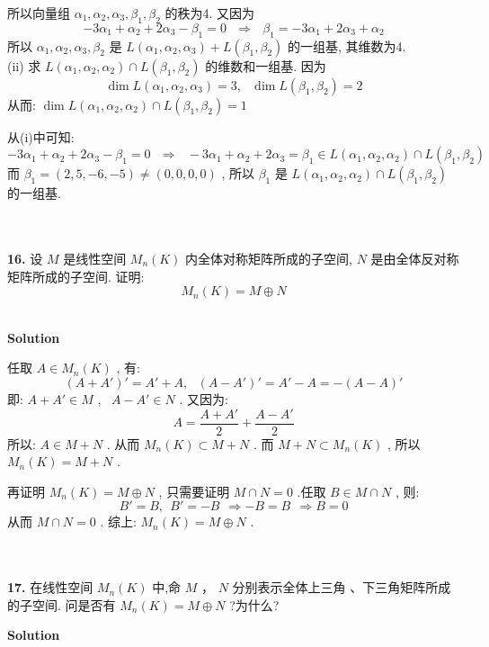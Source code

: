 \documentclass[11pt,a4paper,openany,oneside]{book}
\newcommand\Solution{\noindent\textbf{\textsf{Solution}}\par\medskip}
\begin{document}
所以向量组 $ \alpha_1, \alpha_2, \alpha_3, \beta_1, \beta_2 $ 的秩为4. 又因为
 $$   -3\alpha_1 + \alpha_2 + 2\alpha_3 -\beta_1 = 0 \ \ \ \Rightarrow \ \ \ \beta_1 = -3\alpha_1 + 2\alpha_3 + \alpha_2  $$ 
所以 $ \alpha_1, \alpha_2, \alpha_3, \beta_2 $ 是 $ L(\alpha_1, \alpha_2, \alpha_3) + L(\beta_1, \beta_2) $ 的一组基, 其维数为4.  \\

(ii) 求 $ L(\alpha_1, \alpha_2, \alpha_2) \cap L(\beta_1, \beta_2) $ 的维数和一组基. 因为
 $$  \dim L(\alpha_1, \alpha_2, \alpha_3) = 3, \ \ \ \dim L(\beta_1, \beta_2) = 2  $$ 
从而:  $ \dim L(\alpha_1, \alpha_2, \alpha_2) \cap L(\beta_1, \beta_2) = 1 $ 

从(i)中可知:
 $$  -3\alpha_1 + \alpha_2 + 2\alpha_3 -\beta_1 = 0 \ \ \ \Rightarrow \ \ \ -3\alpha_1 + \alpha_2 + 2\alpha_3 = \beta_1 \in L(\alpha_1, \alpha_2, \alpha_2) \cap L(\beta_1, \beta_2)  $$ 
\hspace{3.3em} 而  $ \beta_1 = (2, 5, -6, -5) \neq (0, 0, 0, 0) $ , 所以 $ \beta_1 $ 是 $ L(\alpha_1, \alpha_2, \alpha_2) \cap L(\beta_1, \beta_2) $ 的一组基.  \\  \\  \\



\begin{myexample}
	\textbf{16.} 
设 $ M $ 是线性空间 $ M_n(K) $ 内全体对称矩阵所成的子空间,  $ N $ 是由全体反对称矩阵所成的子空间. 证明:
 $$  M_n(K) = M \oplus  N  $$    \\  

\end{myexample}
\Solution

任取 $ A \in M_n(K) $ , 有:
 $$  (A + A')' = A' + A , \ \ \ (A - A')' = A' - A  = -(A - A)'   $$ 
\hspace{3em} 即:  $ A + A' \in M $ , \  $ A - A' \in N $ . 又因为:
 $$  A = \dfrac{A+A'}{2} + \dfrac{A - A'}{2}  $$ 
所以: $ A \in M + N $ . 从而 $ M_n(K) \subset M + N $ . 而 $ M + N \subset M_n(K) $ , 所以  $ M_n(K) = M + N $ . 

再证明 $ M_n(K) = M \oplus  N $ , 只需要证明 $ M \cap N = 0 $ .任取 $ B \in M \cap N $ , 则:
 $$  B' = B, \ \ B' = -B \ \ \Rightarrow -B = B \ \ \Rightarrow B = 0  $$ 
\hspace{3em} 从而 $ M \cap N = 0 $ . 综上:  $ M_n(K) = M \oplus  N $ .  \\  \\ \\


\begin{myexample}
	\textbf{17.} 
在线性空间 $ M_n(K) $ 中,命 $ M $ ， $ N $ 分别表示全体上三角 、下三角矩阵所成的子空间. 问是否有 $ M_n(K) = M \oplus  N $ ?为什么?   \\ 

\end{myexample}
\Solution
\end{document}
